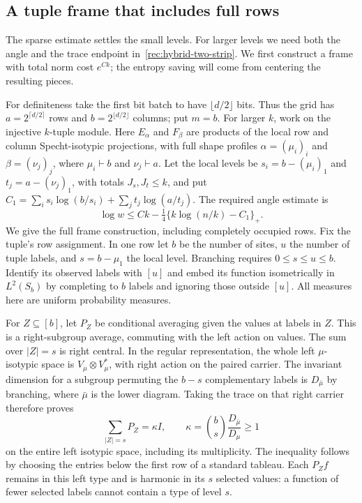 \subsection{A tuple frame that includes full rows}

The sparse estimate settles the small levels. For larger levels we need
both the angle and the trace endpoint in~\eqref{rec:hybrid-two-strip}.
We first construct a frame with total norm cost $e^{Ck}$; the entropy
saving will come from centering the resulting pieces.

For definiteness take the first bit batch to have $\lfloor d/2\rfloor$
bits. Thus the grid has $a=2^{\lceil d/2\rceil}$ rows and
$b=2^{\lfloor d/2\rfloor}$ columns; put $m=b$.
For larger $k$, work on the injective $k$-tuple module. Here $E_\alpha$
and $F_\beta$ are products of the local row and column Specht-isotypic
projections, with full shape profiles $\alpha=(\mu_i)_i$ and
$\beta=(\nu_j)_j$, where $\mu_i\vdash b$ and $\nu_j\vdash a$.
Let the local levels be $s_i=b-(\mu_i)_1$ and $t_j=a-(\nu_j)_1$,
with totals $J_s,J_t\le k$, and put
$C_1=\sum_i s_i\log(b/s_i)+\sum_jt_j\log(a/t_j)$.
The required angle estimate is
\begin{equation}\label{rec:hybrid-tuple-angle}
 \log w\le Ck-\tfrac14\{k\log(n/k)-C_1\}_+.
\end{equation}
We give the full frame construction, including completely occupied
rows.  Fix the tuple's row assignment.  In one row let $b$ be the
number of sites, $u$ the number of tuple labels, and
$s=b-\mu_1$ the local level.  Branching requires
$0\le s\le u\le b$.  Identify its observed labels with $[u]$ and
embed its function isometrically in $L^2(S_b)$ by completing to
$b$ labels and ignoring those outside $[u]$.  All measures here are
uniform probability measures.

For $Z\subseteq[b]$, let $P_Z$ be conditional averaging given the
values at labels in $Z$.  This is a right-subgroup average, commuting
with the left action on values.  The sum over $|Z|=s$ is right central.
In the regular representation, the whole left $\mu$-isotypic space
is $V_\mu\otimes V_\mu^*$, with right action on the paired carrier.
The invariant dimension for a subgroup permuting the $b-s$
complementary labels is $D_{\bar\mu}$ by branching, where
$\bar\mu$ is the lower diagram.  Taking the trace on that right
carrier therefore proves
\begin{equation}\label{rec:hybrid-frame-scalar}
 \sum_{|Z|=s}P_Z=\kappa I,\qquad
 \kappa=\binom bs\frac{D_{\bar\mu}}{D_\mu}\ge1
\end{equation}
on the entire left isotypic space, including its multiplicity.
The inequality follows by choosing the entries below the first row
of a standard tableau.  Each $P_Zf$ remains in this left type and
is harmonic in its $s$ selected values: a function of fewer selected
labels cannot contain a type of level $s$.

